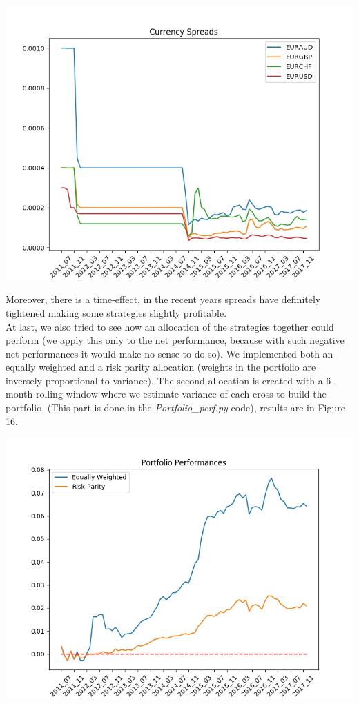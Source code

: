 \documentclass[a4paper]{article}
\begin{document}
\includegraphics[width=\linewidth]{Figures/Spreads.jpeg}
\label{fig:15}
\vspace{10pt}


	
Moreover, there is a time-effect, in the recent years spreads have definitely tightened making some strategies slightly profitable.\\
At last, we also tried to see how an allocation of the strategies together could perform (we apply this only to the net performance, because with such negative net performances it would make no sense to do so). We implemented both an equally weighted and a risk parity allocation (weights in the portfolio are inversely proportional to variance). The second allocation is created with a 6-month rolling window where we estimate variance of each cross to build the portfolio. (This part is done in the \textit{Portfolio\_perf.py} code), results are in Figure 16.

\includegraphics[width=\linewidth]{Figures/Portfolios.jpeg}
\label{fig:16}
\vspace{10pt}
\end{document}
